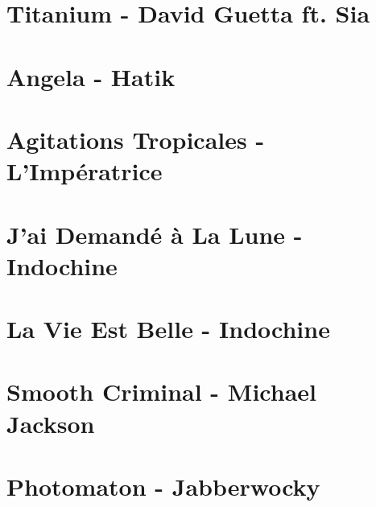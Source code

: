 \documentclass{guitartabs}
\begin{document}
\section{Titanium - David Guetta ft. Sia}
\begin{guitar}

\end{guitar}

\section{Angela - Hatik}
\begin{guitar}

\end{guitar}



\section{Agitations Tropicales - L'Impératrice}




\section*{J'ai Demandé à La Lune - Indochine}
\begin{guitar}

\end{guitar}

\section*{La Vie Est Belle - Indochine}
\begin{guitar}

\end{guitar}

\section{Smooth Criminal - Michael Jackson}
\begin{guitar}

\end{guitar}


\section{Photomaton - Jabberwocky}
\begin{guitar}

\end{guitar}
\end{document}
